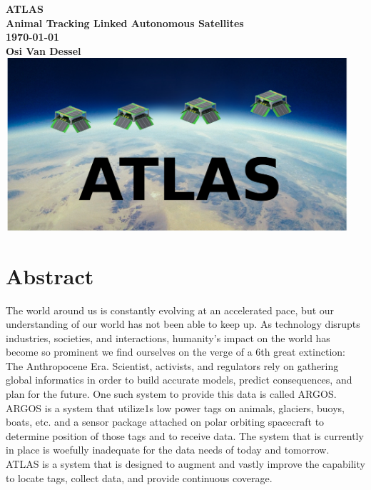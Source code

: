 \documentclass{article}
\begin{document}
\begin{titlepage}
    \centering
    \vfill
    {\bfseries\Large
        ATLAS\\
	Animal Tracking Linked Autonomous Satellites\\
	\today \\
        \vskip1cm
	Osi Van Dessel\\
    }    
    \vfill
    \includegraphics[width=5in]{figures/TitleImage.png} %
    \vfill
    \vfill
\end{titlepage}

\section{Abstract}
The world around us is constantly evolving at an accelerated pace, but our understanding of our world has not been able to keep up. As technology disrupts industries, societies, and interactions, humanity's impact on the world has become so prominent we find ourselves on the verge of a 6th great extinction: The Anthropocene Era. Scientist, activists, and regulators rely on gathering global informatics in order to build accurate models, predict consequences, and plan for the future. One such system to provide this data is called ARGOS. ARGOS is a system that utilize1s low power tags on animals, glaciers, buoys, boats, etc. and a sensor package attached on polar orbiting spacecraft to determine position of those tags and to receive data. The system that is currently in place is woefully inadequate for the data needs of today and tomorrow. ATLAS is a system that is designed to augment and vastly improve the capability to locate tags, collect data, and provide continuous coverage. 

\end{document}
